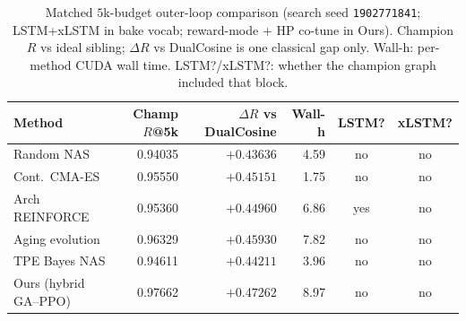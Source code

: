 \begin{table}[t]
  \centering
  \caption{Matched $5$k-budget outer-loop comparison (search seed \texttt{1902771841}; LSTM+xLSTM in bake vocab; reward-mode + HP co-tune in Ours). Champion $R$ vs ideal sibling; $\Delta R$ vs DualCosine is one classical gap only. Wall-h: per-method CUDA wall time. LSTM?/xLSTM?: whether the champion graph included that block.}
  \label{tab:meta-approaches}
  \setlength{\tabcolsep}{3pt}
  \small
  \begin{tabular}{@{}lrrrcc@{}}
    \toprule
    Method & Champ $R$@5k & $\Delta R$ vs DualCosine & Wall-h & LSTM? & xLSTM? \\
    \midrule
    Random NAS & 0.94035 & $+0.43636$ & 4.59 & no & no \\
    Cont.\ CMA-ES & 0.95550 & $+0.45151$ & 1.75 & no & no \\
    Arch REINFORCE & 0.95360 & $+0.44960$ & 6.86 & yes & no \\
    Aging evolution & 0.96329 & $+0.45930$ & 7.82 & no & no \\
    TPE Bayes NAS & 0.94611 & $+0.44211$ & 3.96 & no & no \\
    Ours (hybrid GA--PPO) & 0.97662 & $+0.47262$ & 8.97 & no & no \\
    \bottomrule
  \end{tabular}
\end{table}
